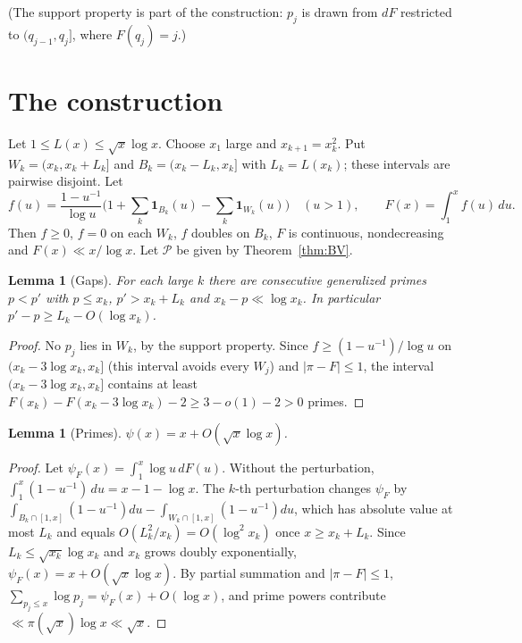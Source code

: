 \documentclass[11pt]{amsart}
\newtheorem{lemma}[theorem]{Lemma}
\theoremstyle{remark}\newtheorem{remark}[theorem]{Remark}
\begin{document}
(The support property is part of the construction: $p_j$ is drawn from $dF$ restricted to $(q_{j-1},q_j]$, where $F(q_j)=j$.)

\section{The construction}
Let $1\le L(x)\le\sqrt{x}\log x$. Choose $x_1$ large and $x_{k+1}=x_k^2$. Put $W_k=(x_k,x_k+L_k]$ and $B_k=(x_k-L_k,x_k]$ with $L_k=L(x_k)$; these intervals are pairwise disjoint. Let
\[
f(u)=\frac{1-u^{-1}}{\log u}\Big(1+\sum_k \mathbf 1_{B_k}(u)-\sum_k\mathbf 1_{W_k}(u)\Big)\quad(u>1),\qquad F(x)=\int_1^x f(u)\,du .
\]
Then $f\ge0$, $f=0$ on each $W_k$, $f$ doubles on $B_k$, $F$ is continuous, nondecreasing and $F(x)\ll x/\log x$. Let $\mathcal P$ be given by Theorem~\ref{thm:BV}.

\begin{lemma}[Gaps]\label{lem:gap}
For each large $k$ there are consecutive generalized primes $p<p'$ with $p\le x_k$, $p'>x_k+L_k$ and $x_k-p\ll \log x_k$. In particular $p'-p\ge L_k-O(\log x_k)$.
\end{lemma}
\begin{proof}
No $p_j$ lies in $W_k$, by the support property. Since $f\ge (1-u^{-1})/\log u$ on $(x_k-3\log x_k,x_k]$ (this interval avoids every $W_j$) and $|\pi-F|\le1$, the interval $(x_k-3\log x_k,x_k]$ contains at least $F(x_k)-F(x_k-3\log x_k)-2\ge 3-o(1)-2>0$ primes.
\end{proof}

\begin{lemma}[Primes]\label{lem:psi}
$\psi(x)=x+O(\sqrt{x}\log x)$.
\end{lemma}
\begin{proof}
Let $\psi_F(x)=\int_1^x\log u\,dF(u)$. Without the perturbation, $\int_1^x(1-u^{-1})\,du=x-1-\log x$. The $k$-th perturbation changes $\psi_F$ by $\int_{B_k\cap[1,x]}(1-u^{-1})du-\int_{W_k\cap[1,x]}(1-u^{-1})du$, which has absolute value at most $L_k$ and equals $O(L_k^2/x_k)=O(\log^2x_k)$ once $x\ge x_k+L_k$. Since $L_k\le\sqrt{x_k}\log x_k$ and $x_k$ grows doubly exponentially, $\psi_F(x)=x+O(\sqrt x\log x)$. By partial summation and $|\pi-F|\le1$, $\sum_{p_j\le x}\log p_j=\psi_F(x)+O(\log x)$, and prime powers contribute $\ll\pi(\sqrt x)\log x\ll\sqrt x$.
\end{proof}
\end{document}
